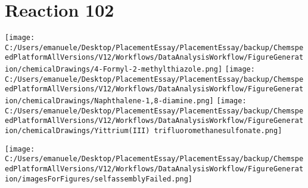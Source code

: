 \documentclass{article}%
\begin{document}
\section*{Reaction 102}%
%
\begin{scheme}[H]%
\begin{minipage}{0.5\textwidth}%
\texttt{[image: C:/Users/emanuele/Desktop/PlacementEssay/PlacementEssay/backup/ChemspeedPlatformAllVersions/V12/Workflows/DataAnalysisWorkflow/FigureGeneration/chemicalDrawings/4-Formyl-2-methylthiazole.png]}%
\texttt{[image: C:/Users/emanuele/Desktop/PlacementEssay/PlacementEssay/backup/ChemspeedPlatformAllVersions/V12/Workflows/DataAnalysisWorkflow/FigureGeneration/chemicalDrawings/Naphthalene-1,8-diamine.png]}%
\texttt{[image: C:/Users/emanuele/Desktop/PlacementEssay/PlacementEssay/backup/ChemspeedPlatformAllVersions/V12/Workflows/DataAnalysisWorkflow/FigureGeneration/chemicalDrawings/Yittrium(III) trifluoromethanesulfonate.png]}%
\end{minipage}%
\begin{minipage}{0.5\textwidth}%
\begin{center}%
\texttt{[image: C:/Users/emanuele/Desktop/PlacementEssay/PlacementEssay/backup/ChemspeedPlatformAllVersions/V12/Workflows/DataAnalysisWorkflow/FigureGeneration/imagesForFigures/selfassemblyFailed.png]}%
\end{center}%
\end{minipage}%
\caption{Self-assembly of components 1, 21, with Yittrium(III) in a 3.0:1.5:1.0 molar ratio in CH$_3$CN at 60\textdegree C for 40h. These are the reagents (starting materials) for reaction 102.}%
\end{scheme}%
\end{document}

